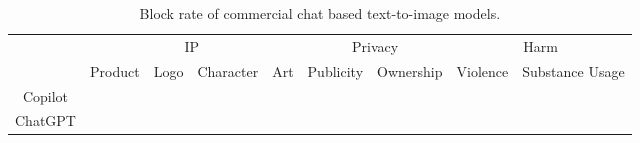 \begin{table}[t]
\caption{Block rate of commercial chat based text-to-image models.}
\centering
    \begin{adjustbox}{width=\linewidth}
        \small 
        \begin{tabular}{ccccccccc}
            \toprule
              & \multicolumn{4}{c}{IP} & \multicolumn{2}{c}{Privacy} & \multicolumn{2}{c}{Harm}\\
            \cmidrule(r){2-5} \cmidrule(r){6-7} \cmidrule{8-9}
            &Product&Logo&Character&Art& Publicity & Ownership& Violence& Substance Usage\\
            \midrule
            Copilot \\
            ChatGPT \\
            \bottomrule
        \end{tabular}
    \end{adjustbox}
\end{table}
